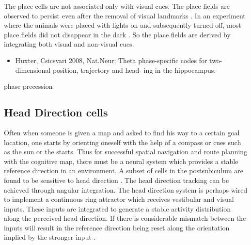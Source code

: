 The place cells are not associated only with visual cues. The place fields are observed to persist even after the removal of visual landmarks \cite{Kubie1987}. In an experiment where the animals were placed with lights on and subsequently turned off, most place fields did not disappear in the dark \cite{Muller2008}. So the place fields are derived by integrating both visual and non-visual cues. \\ 

\begin{itemize}
Mehta, Barenes and Mc Naughton1997 - pfs shift backwards after repeated traversals along the same trajectory 
Place cell firing is also correlated with speed, direction, and turning angle  and stage of the task \\
Markus 1995 - pfs are task sensitive, pfs rapidly changed when the task changed to random foraging and search for food at the corners of a diamond\\

extra hippocampal cells have also been reported, but show different characteristics the hippocampal place cells\\
Wilson MccNaughton 1993 - place cells recorded with tetrode shower fewer subfields\\

\item Huxter, Csicsvari 2008, Nat.Neur; Theta phase-specific
codes for two-dimensional position, trajectory and head-
ing in the hippocampus.

\end{itemize}
 phase precession
 
\subsection{Head Direction cells}
Often when someone is given a map and asked to find his way to a certain goal location, one starts by orienting oneself with the help of a compass or cues such as the sun or the starts. Thus for successful spatial navigation and route planning with the cognitive map, there must be a neural system which provides a stable reference direction in an environment. A subset of cells in the postsubiculum  are found to be sensitive to head direction \cite{Taube1990}. The head direction tracking can be achieved through angular integration. The head direction system is perhaps wired to implement a continuous ring attractor which receives vestibular and visual inputs. These inputs are integrated to generate a stable activity distribution along the perceived head direction. If there is considerable mismatch between the inputs will result in the reference direction being reset along the orientation implied by the stronger input \cite{Valerio2012}.

